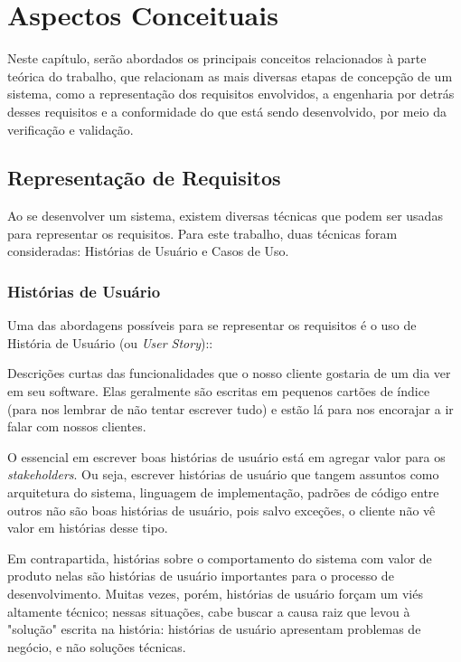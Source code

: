 \chapter{Aspectos Conceituais}
Neste capítulo, serão abordados os principais conceitos relacionados à parte teórica do trabalho, que relacionam as mais diversas etapas de concepção de um sistema, como a representação dos requisitos envolvidos, a engenharia por detrás desses requisitos e a conformidade do que está sendo desenvolvido, por meio da verificação e validação.

\section{Representação de Requisitos}
Ao se desenvolver um sistema, existem diversas técnicas que podem ser usadas para representar os requisitos. Para este trabalho, duas técnicas foram consideradas: Histórias de Usuário e Casos de Uso.

\subsection{Histórias de Usuário}
Uma das abordagens possíveis para se representar os requisitos é o uso de História de Usuário (ou \textit{User Story}):\cite{jonathanrasmusson}:

\begin{citacaoLonga}
Descrições curtas das funcionalidades que o nosso cliente
gostaria de um dia ver em seu software. Elas geralmente são escritas em pequenos cartões de índice (para nos lembrar de não tentar escrever tudo) e estão lá para nos encorajar a ir falar com nossos clientes.
\end{citacaoLonga}

O essencial em escrever boas histórias de usuário está em agregar valor para os \textit{stakeholders}. Ou seja, escrever histórias de usuário que tangem assuntos como arquitetura do sistema, linguagem de implementação, padrões de código entre outros não são boas histórias de usuário, pois salvo exceções, o cliente não vê valor em histórias desse tipo\cite{jonathanrasmusson}.

Em contrapartida, histórias sobre o comportamento do sistema com valor de produto nelas são histórias de usuário importantes para o processo de desenvolvimento. Muitas vezes, porém, histórias de usuário forçam um viés altamente técnico; nessas situações, cabe buscar a causa raiz que levou à "solução" escrita na história: histórias de usuário apresentam problemas de negócio, e não soluções técnicas.

